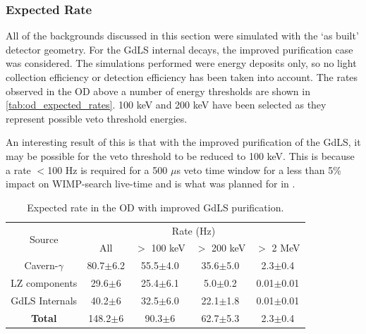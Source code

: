 \subsubsection{Expected Rate}
\par
All of the backgrounds discussed in this section were simulated with the `as built' detector geometry.
For the GdLS internal decays, the improved purification case was considered.
The simulations performed were energy deposits only, so no light collection efficiency or detection efficiency has been taken into account.
The rates observed in the OD above a number of energy thresholds are shown in \autoref{tab:od_expected_rates}.
100 keV and 200 keV have been selected as they represent possible veto threshold energies.


\par
An interesting result of this is that with the improved purification of the GdLS, it may be possible for the veto threshold to be reduced to 100 keV.
This is because a rate $<$100 Hz is required for a 500 $\mu$s veto time window for a less than 5\% impact on WIMP-search live-time and is what was planned for in \cite{LZ_TechnicalDesignReview_ref}.

\begin{table}[]
    \centering
    \begin{tabular}{c|c|c|c|c} %
    \hline
    \multirow{2}{*}{Source} & \multicolumn{4}{c}{Rate (Hz)} \\
                            & All          & $>$ 100 keV   & $>$ 200 keV   & $>$ 2 MeV \\ \hline
    Cavern-$\gamma$         & 80.7$\pm$6.2 & 55.5$\pm$4.0  & 35.6$\pm$5.0  & 2.3$\pm$0.4     \\
    LZ components           & 29.6$\pm$6   & 25.4$\pm$6.1  & 5.0$\pm$0.2   & 0.01$\pm$0.01   \\
    GdLS Internals          & 40.2$\pm$6   & 32.5$\pm$6.0  & 22.1$\pm$1.8  & 0.01$\pm$0.01   \\ \hline
    \textbf{Total}          & 148.2$\pm$6  & 90.3$\pm$6    & 62.7$\pm$5.3  & 2.3$\pm$0.4      \\ \hline
    \end{tabular}
    \caption{Expected rate in the OD with improved GdLS purification.}
    \label{tab:od_expected_rates}
\end{table} 




